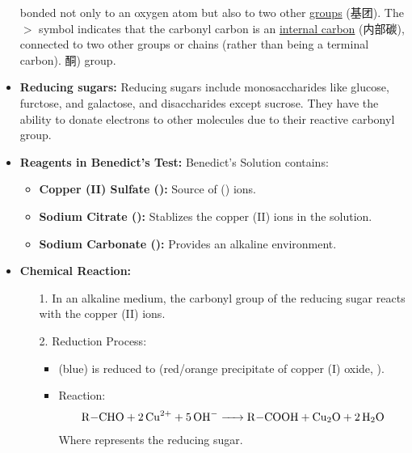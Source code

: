 \begin{itemize}
{    bonded not only to an oxygen atom but also to two other \underline{groups} (基团). The $>$ symbol indicates that the carbonyl
    carbon is an \underline{internal carbon} (内部碳), connected to two other groups or chains (rather than being a terminal
    carbon).} 酮) group.
    \item \textbf{Reducing sugars:} Reducing sugars include monosaccharides like glucose, furctose, and galactose, and
    disaccharides except sucrose. They have the ability to donate electrons to other molecules due to their reactive carbonyl
    group.
    \item \textbf{Reagents in Benedict's Test:} Benedict's Solution contains:
    \begin{itemize}
        \item \textbf{Copper (II) Sulfate ():} Source of () ions.
        \item \textbf{Sodium Citrate ():} Stablizes the copper (II) ions in the solution.
        \item \textbf{Sodium Carbonate ():} Provides an alkaline environment.
    \end{itemize}
    \item \textbf{Chemical Reaction:}
    \begin{itemize}
        \item[1.] In an alkaline medium, the carbonyl group of the reducing sugar reacts with the copper (II) ions.
        \item[2.] Reduction Process:
        \begin{itemize}
            \item {} (blue) is reduced to  (red/orange precipitate of copper (I) oxide, ).
            \item Reaction:
            \begin{equation}
                \ce{R-CHO + 2Cu^2+ + 5OH^- -> R-COOH + Cu2O + 2H2O}
            \end{equation}
            Where  represents the reducing sugar.
        \end{itemize} 

\end{itemize}
\end{itemize}
